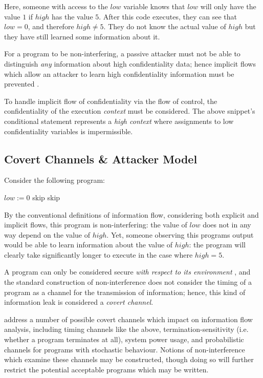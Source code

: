 Here, someone with access to the $ low $ variable knows that $ low $ will only have the value $ 1 $ if $ high $ has the value $ 5 $. After this code executes, they can see that $ low = 0 $, and therefore $ high \ne 5 $. They do not know the actual value of $ high $ but they have still learned some information about it.

For a program to be non-interfering, a passive attacker must not be able to distinguish \textit{any} information about high confidentiality data; hence implicit flows which allow an attacker to learn high confidentiality information must be prevented \cite{sabelfeld2003if}.

To handle implicit flow of confidentiality via the flow of control, the confidentiality of the execution \textit{context} must be considered. The above snippet's conditional statement represents a \textit{high context} where assignments to low confidentiality variables is impermissible.

\clearpage

\subsection{Covert Channels \& Attacker Model}

Consider the following program:

\begin{algorithmic}
	\State $ low := 0 $
			\State skip
		\EndFor
	\Else
		\State skip
	\EndIf
\end{algorithmic}

By the conventional definitions of information flow, considering both explicit and implicit flows, this program is non-interfering: the value of $ low $ does not in any way depend on the value of $ high $. Yet, someone observing this programs output would be able to learn information about the value of $ high $: the program will clearly take significantly longer to execute in the case where $ high = 5 $.

A program can only be considered secure \textit{with respect to its environment} \cite{sabelfeld2003if}, and the standard construction of non-interference does not consider the timing of a program as a channel for the transmission of information; hence, this kind of information leak is considered a \textit{covert channel}.

\citeauthor{sabelfeld2003if} \cite{sabelfeld2003if} address a number of possible covert channels which impact on information flow analysis, including timing channels like the above, termination-sensitivity (i.e. whether a program terminates at all), system power usage, and probabilistic channels for programs with stochastic behaviour. Notions of non-interference which examine these channels may be constructed, though doing so will further restrict the potential acceptable programs which may be written.


